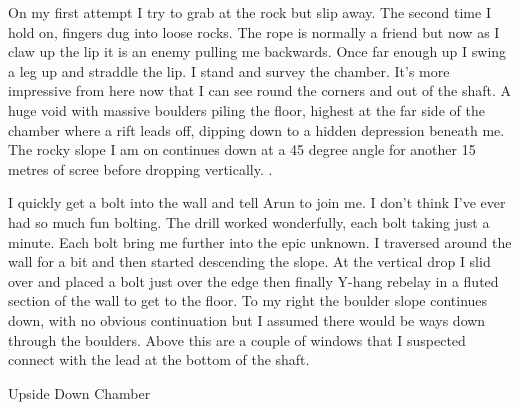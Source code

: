 On my first attempt I try to grab at the rock but slip away. The second time I hold on, fingers dug into loose rocks. The rope is normally a friend but now as I claw up the lip it is an enemy pulling me backwards. Once far enough up I swing a leg up and straddle the lip. I stand and survey the chamber. It's more impressive from here now that I can see round the corners and out of the shaft. A huge void with massive boulders piling the floor, highest at the far side of the chamber where a rift leads off, dipping down to a hidden depression beneath me. The rocky slope I am on continues down at a 45 degree angle for another 15 metres of scree before dropping vertically. . 

I quickly get a bolt into the wall and tell Arun to join me. I don't think I've ever had so much fun bolting. The drill worked wonderfully, each bolt taking just a minute. Each bolt bring me further into the epic unknown. I traversed around the wall for a bit and then started descending the slope. At the vertical drop I slid over and placed a bolt just over the edge then finally Y-hang rebelay in a fluted section of the wall to get to the floor. To my right the boulder slope continues down, with no obvious continuation but I assumed there would be ways down through the boulders. Above this are a couple of windows that I suspected connect with the lead at the bottom of the shaft.

\begin{survey}[t!]
\checkoddpage \ifoddpage \forcerectofloat \else \forceversofloat \fi
{}
\caption{Upside Down Chamber} \label{map: upside down}
\end{survey}

